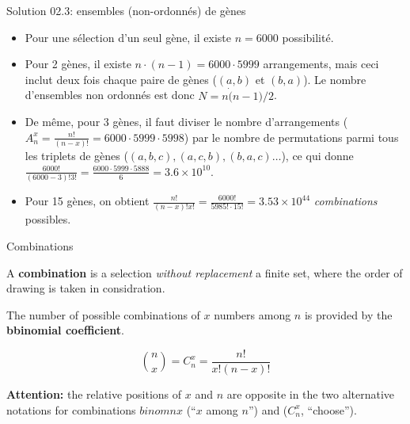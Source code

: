 \documentclass[ignorenonframetext,]{beamer}
\providecommand{\tightlist}{%
  \setlength{\itemsep}{0pt}\setlength{\parskip}{0pt}}
\begin{document}
\begin{frame}{Solution 02.3: ensembles (non-ordonnés) de gènes}
\protect\hypertarget{solution-02.3-ensembles-non-ordonnes-de-genes}{}

\begin{itemize}
\tightlist
\item
  Pour une sélection d'un seul gène, il existe \(n=6000\) possibilité.
\item
  Pour 2 gènes, il existe \(n \cdot (n-1) = 6000 \cdot 5999\)
  arrangements, mais ceci inclut deux fois chaque paire de gènes
  (\((a, b)\) et \((b, a)\)). Le nombre d'ensembles non ordonnés est
  donc \(N = n \dot (n-1)/2\).
\item
  De même, pour 3 gènes, il faut diviser le nombre d'arrangements
  (\(A^x_n = \frac{n!}{(n-x)!} = 6000 \cdot 5999 \cdot 5998\)) par le
  nombre de permutations parmi tous les triplets de gènes
  (\((a, b, c), (a, c, b), (b, a, c) \ldots\)), ce qui donne
  \(\frac{6000!}{(6000-3)! 3!} = \frac{6000 \cdot 5999 \cdot 5888}{6} = \ensuremath{3.6\times 10^{10}}\).
\item
  Pour 15 gènes, on obtient
  \(\frac{n!}{(n-x)!x!} = \frac{6000!}{5985! \cdot 15!} = \ensuremath{3.53\times 10^{44}}\)
  \emph{combinations} possibles.
\end{itemize}

\end{frame}

\begin{frame}{Combinations}
\protect\hypertarget{combinations}{}

A \textbf{combination} is a selection \emph{without replacement} a
finite set, where the order of drawing is taken in considration.

The number of possible combinations of \(x\) numbers among \(n\) is
provided by the \textbf{bbinomial coefficient}.

\[\binom{n}{x} = C^x_n = \frac{n!}{x! (n-x)!}\]

\textbf{Attention: } the relative positions of \(x\) and \(n\) are
opposite in the two alternative notations for combinations
\(binom{n}{x}\) (``\(x\) among \(n\)'') and (\(C^x_n\), ``choose'').

\end{frame}
\end{document}
